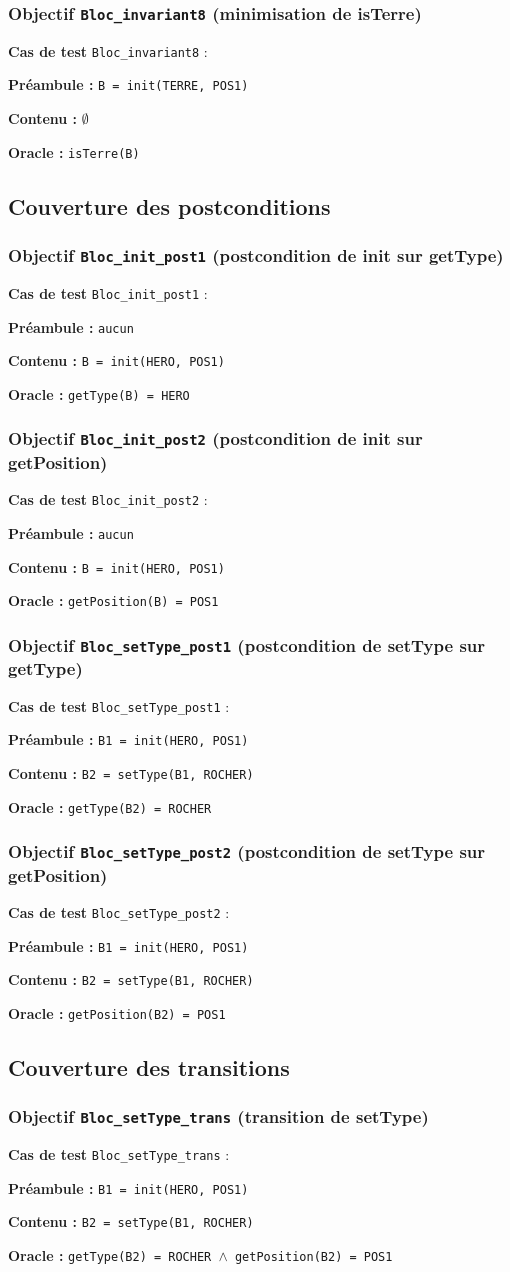 \documentclass{article}
\newcommand{\cmd}[1]{\texttt{#1}}
\newcommand{\lAND}{$\land$}
\newcommand{\obj}[2]{\subsubsection*{\large{\textbf{Objectif {\cmd{#1} (#2)}}}}}
\newenvironment{cas}[1]
{
	\hspace{1em}\textbf{Cas de test} \cmd{#1} :
	\begin{list}{}{}
}{
	\end{list}\vspace{1em}
}
\newcommand{\pre}[1]{\item \textbf{Préambule :} \cmd{#1}}
\newcommand{\ope}[1]{\item \textbf{Contenu :} \cmd{#1}}
\newcommand{\nope}{\item \textbf{Contenu :} $\emptyset$}
\newcommand{\ora}[1]{\item \textbf{Oracle :} \cmd{#1}}
\begin{document}
\obj{Bloc\_invariant8} {minimisation de isTerre}
	\begin{cas}{Bloc\_invariant8}
		\pre{B = init(TERRE, POS1)}
		\nope{}
		\ora{isTerre(B)}
	\end{cas}


\subsection*{Couverture des postconditions}

\obj{Bloc\_init\_post1} {postcondition de init sur getType}
	\begin{cas}{Bloc\_init\_post1}
		\pre{aucun}
		\ope{B = init(HERO, POS1)}
		\ora{getType(B) = HERO}
	\end{cas}

\obj{Bloc\_init\_post2} {postcondition de init sur getPosition}
	\begin{cas}{Bloc\_init\_post2}
		\pre{aucun}
		\ope{B = init(HERO, POS1)}
		\ora{getPosition(B) = POS1}
	\end{cas}

\obj{Bloc\_setType\_post1} {postcondition de setType sur getType}
	\begin{cas}{Bloc\_setType\_post1}
		\pre{B1 = init(HERO, POS1)}
		\ope{B2 = setType(B1, ROCHER)}
		\ora{getType(B2) = ROCHER}
	\end{cas}


\obj{Bloc\_setType\_post2} {postcondition de setType sur getPosition}
	\begin{cas}{Bloc\_setType\_post2}
		\pre{B1 = init(HERO, POS1)}
		\ope{B2 = setType(B1, ROCHER)}
		\ora{getPosition(B2) = POS1}
	\end{cas}


\subsection*{Couverture des transitions}

\obj{Bloc\_setType\_trans} {transition de setType}
	\begin{cas}{Bloc\_setType\_trans}
		\pre{B1 = init(HERO, POS1)}
		\ope{B2 = setType(B1, ROCHER)}
		\ora{getType(B2) = ROCHER \lAND{} getPosition(B2) = POS1}
	\end{cas}

\clearpage{}
\end{document}
